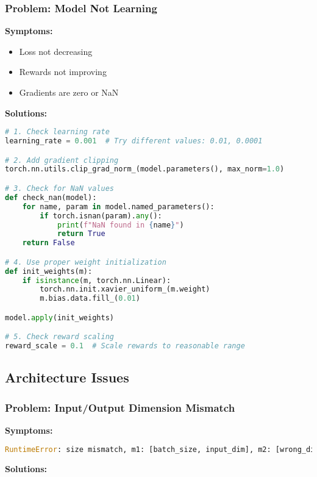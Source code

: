 \subsubsection{Problem: Model Not Learning}

\textbf{Symptoms:}
\begin{itemize}
    \item Loss not decreasing
    \item Rewards not improving
    \item Gradients are zero or NaN
\end{itemize}

\textbf{Solutions:}

\begin{lstlisting}[language=python, caption=Fix Learning Issues]
# 1. Check learning rate
learning_rate = 0.001  # Try different values: 0.01, 0.0001

# 2. Add gradient clipping
torch.nn.utils.clip_grad_norm_(model.parameters(), max_norm=1.0)

# 3. Check for NaN values
def check_nan(model):
    for name, param in model.named_parameters():
        if torch.isnan(param).any():
            print(f"NaN found in {name}")
            return True
    return False

# 4. Use proper weight initialization
def init_weights(m):
    if isinstance(m, torch.nn.Linear):
        torch.nn.init.xavier_uniform_(m.weight)
        m.bias.data.fill_(0.01)

model.apply(init_weights)

# 5. Check reward scaling
reward_scale = 0.1  # Scale rewards to reasonable range
\end{lstlisting}

\subsection{Architecture Issues}

\subsubsection{Problem: Input/Output Dimension Mismatch}

\textbf{Symptoms:}
\begin{lstlisting}[language=python]
RuntimeError: size mismatch, m1: [batch_size, input_dim], m2: [wrong_dim, hidden_dim]
\end{lstlisting}

\textbf{Solutions:}

